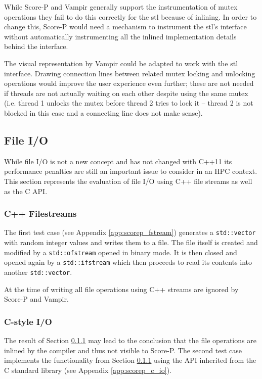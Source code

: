 While Score-P and Vampir generally support the instrumentation of mutex operations they fail to do this correctly for the \gls{stl} because of inlining. In order to change this, Score-P would need a mechanism to instrument the \gls{stl}'s interface without automatically instrumenting all the inlined implementation details behind the interface.

The visual representation by Vampir could be adapted to work with the \gls{stl} interface. Drawing connection lines between related mutex locking and unlocking operations would improve the user experience even further; these are not needed if threads are not actually waiting on each other despite using the same mutex (i.e. thread 1 unlocks the mutex before thread 2 tries to lock it -- thread 2 is not blocked in this case and a connecting line does not make sense).

\subsection{File I/O}

While file I/O is not a new concept and has not changed with C++11 its performance penalties are still an important issue to consider in an HPC context. This section represents the evaluation of file I/O using C++ file streams as well as the C API.

\subsubsection{C++ Filestreams}\label{scorep:fstream}

The first test case (see Appendix \ref{app:scorep_fstream}) generates a \texttt{std::vector} with random integer values and writes them to a file. The file itself is created and modified by a \texttt{std::ofstream} opened in binary mode. It is then closed and opened again by a \texttt{std::ifstream} which then proceeds to read its contents into another \texttt{std::vector}.

At the time of writing all file operations using C++ streams are ignored by Score-P and Vampir.

\subsubsection{C-style I/O}\label{scorep:c_io}

The result of Section \ref{scorep:fstream} may lead to the conclusion that the file operations are inlined by the compiler and thus not visible to Score-P. The second test case implements the functionality from Section \ref{scorep:fstream} using the API inherited from the C standard library (see Appendix \ref{app:scorep_c_io}).

